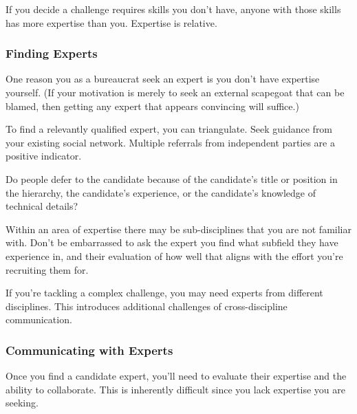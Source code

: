 If you decide a challenge requires skills you don't have, anyone with those skills has more expertise than you. Expertise is relative. 

\subsubsection*{Finding Experts}

One reason you as a bureaucrat seek an expert is you don't have expertise yourself. (If your motivation is merely to seek an external scapegoat that can be blamed, then getting any expert that appears convincing will suffice.)

To find a relevantly qualified expert, you can triangulate. Seek guidance from your existing social network. Multiple referrals from independent parties are a positive indicator. 

Do people defer to the candidate because of the candidate's title or position in the hierarchy, the candidate's experience, or the candidate's knowledge of technical details?

Within an area of expertise there may be sub-disciplines that you are not familiar with. Don't be embarrassed to ask the expert you find what subfield they have experience in, and their evaluation of how well that aligns with the effort you're recruiting them for.

If you're tackling a complex challenge, you may need experts from different disciplines. This introduces additional challenges of cross-discipline communication. 





\subsubsection*{Communicating with Experts}
Once you find a candidate expert, you'll need to evaluate their expertise and the ability to collaborate. This is inherently difficult since you lack expertise you are seeking. 

